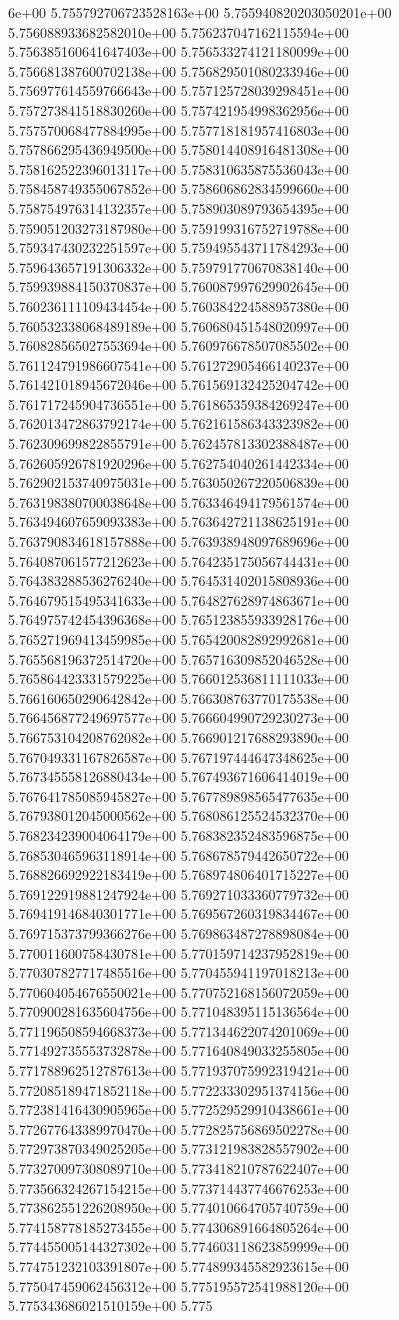6e+00	5.755792706723528163e+00	5.755940820203050201e+00	5.756088933682582010e+00	5.756237047162115594e+00	5.756385160641647403e+00	5.756533274121180099e+00	5.756681387600702138e+00	5.756829501080233946e+00	5.756977614559766643e+00	5.757125728039298451e+00	5.757273841518830260e+00	5.757421954998362956e+00	5.757570068477884995e+00	5.757718181957416803e+00	5.757866295436949500e+00	5.758014408916481308e+00	5.758162522396013117e+00	5.758310635875536043e+00	5.758458749355067852e+00	5.758606862834599660e+00	5.758754976314132357e+00	5.758903089793654395e+00	5.759051203273187980e+00	5.759199316752719788e+00	5.759347430232251597e+00	5.759495543711784293e+00	5.759643657191306332e+00	5.759791770670838140e+00	5.759939884150370837e+00	5.760087997629902645e+00	5.760236111109434454e+00	5.760384224588957380e+00	5.760532338068489189e+00	5.760680451548020997e+00	5.760828565027553694e+00	5.760976678507085502e+00	5.761124791986607541e+00	5.761272905466140237e+00	5.761421018945672046e+00	5.761569132425204742e+00	5.761717245904736551e+00	5.761865359384269247e+00	5.762013472863792174e+00	5.762161586343323982e+00	5.762309699822855791e+00	5.762457813302388487e+00	5.762605926781920296e+00	5.762754040261442334e+00	5.762902153740975031e+00	5.763050267220506839e+00	5.763198380700038648e+00	5.763346494179561574e+00	5.763494607659093383e+00	5.763642721138625191e+00	5.763790834618157888e+00	5.763938948097689696e+00	5.764087061577212623e+00	5.764235175056744431e+00	5.764383288536276240e+00	5.764531402015808936e+00	5.764679515495341633e+00	5.764827628974863671e+00	5.764975742454396368e+00	5.765123855933928176e+00	5.765271969413459985e+00	5.765420082892992681e+00	5.765568196372514720e+00	5.765716309852046528e+00	5.765864423331579225e+00	5.766012536811111033e+00	5.766160650290642842e+00	5.766308763770175538e+00	5.766456877249697577e+00	5.766604990729230273e+00	5.766753104208762082e+00	5.766901217688293890e+00	5.767049331167826587e+00	5.767197444647348625e+00	5.767345558126880434e+00	5.767493671606414019e+00	5.767641785085945827e+00	5.767789898565477635e+00	5.767938012045000562e+00	5.768086125524532370e+00	5.768234239004064179e+00	5.768382352483596875e+00	5.768530465963118914e+00	5.768678579442650722e+00	5.768826692922183419e+00	5.768974806401715227e+00	5.769122919881247924e+00	5.769271033360779732e+00	5.769419146840301771e+00	5.769567260319834467e+00	5.769715373799366276e+00	5.769863487278898084e+00	5.770011600758430781e+00	5.770159714237952819e+00	5.770307827717485516e+00	5.770455941197018213e+00	5.770604054676550021e+00	5.770752168156072059e+00	5.770900281635604756e+00	5.771048395115136564e+00	5.771196508594668373e+00	5.771344622074201069e+00	5.771492735553732878e+00	5.771640849033255805e+00	5.771788962512787613e+00	5.771937075992319421e+00	5.772085189471852118e+00	5.772233302951374156e+00	5.772381416430905965e+00	5.772529529910438661e+00	5.772677643389970470e+00	5.772825756869502278e+00	5.772973870349025205e+00	5.773121983828557902e+00	5.773270097308089710e+00	5.773418210787622407e+00	5.773566324267154215e+00	5.773714437746676253e+00	5.773862551226208950e+00	5.774010664705740759e+00	5.774158778185273455e+00	5.774306891664805264e+00	5.774455005144327302e+00	5.774603118623859999e+00	5.774751232103391807e+00	5.774899345582923615e+00	5.775047459062456312e+00	5.775195572541988120e+00	5.775343686021510159e+00	5.775
